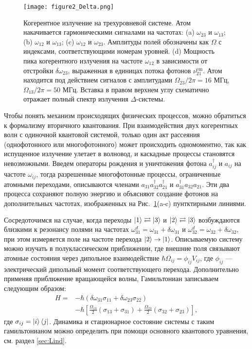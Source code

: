 \begin{figure}[!th]
	\centering
	\texttt{[image: figure2\_Delta.png]}
	\caption[Режимы трехволнового смешения на трехуровневой $\Delta$-системе]{Когерентное излучение на трехуровневой системе. Атом накачивается гармоническими сигналами на частотах: (a) $\omega_{23}$ и $\omega_{13}$; (b) $\omega_{12}$ и $\omega_{13}$; (c) $\omega_{12}$ и $\omega_{23}$. Амплитуды полей обозначены как $\Omega$ с индексами, соответствующими номерам уровней. (d) Мощность пика когерентного излучения на частоте $\omega_{12}$ в зависимости от отстройки $\delta\omega_{23}$, выраженная в единицах потока фотонов $\nu_{21}^{\text{em}}$. Атом находится под действием сигналов с амплитудами $\Omega_{23}/2\pi=16$ МГц, $\Omega_{13}/2\pi=50$ МГц. Вставка в правом верхнем углу схематично отражает полный спектр излучения $\Delta$-системы. }
	\label{fig: 3wm_regimes}
\end{figure}

Чтобы понять механизм происходящих физических процессов, можно обратиться к формализму вторичного квантования. При взаимодействия двух когерентных волн с одиночной квантовой системой, только один акт рассеяния (однофотонного или многофотонного) может происходить одномоментно, так как испущенное излучение улетает в волновод, и каскадные процессы становятся невозможными. Введем операторы рождения и уничтожения фотона  $a^{\dagger}_{ij} \text{ и }a_{ij}$ на частоте $\omega_{ij}$, тогда разрешенные многофотонные процессы, ограниченные атомными переходами, описываются членами $a_{31}a_{32}^{\dagger}a_{21}^{\dagger}$ и $a_{31}^{\dagger}a_{32}a_{21}$. Эти два процесса сохраняют полную энергию и объясняют создание фотонов на дополнительных частотах, изображенных на Рис.~\ref{fig: 3wm_regimes}(a-c) пунтктирными линиями.

Сосредоточимся на случае, когда переходы $\ket{1} \rightleftarrows \ket{3}$ и $\ket{2} \rightleftarrows \ket{3}$ возбуждаются близкими к резонансу полями на частотах $\omega_{31}^{d}=\omega_{31}+\delta\omega_{31}$ и $\omega_{32}^{d}=\omega_{32}+\delta\omega_{32}$, при этом измеряется поле на частоте перехода $\ket{2}\rightarrow\ket{1}$. Описываемую систему можно изучать в полуклассическом приближении, где внешние поля связывают атомные состояния через дипольное взаимодействие $\hbar\Omega_{ij}=\phi_{ij}V_{ij}$, где $\phi_{ij}$ --- электрический дипольный момент соответствующего перехода. Дополнительно применяя приближение вращающейся волны, Гамильтониан записываем следующим образом:
\begin{equation}
	\begin{aligned}
		H={}&-\hbar(\delta\omega_{31}\sigma_{11}+\delta\omega_{23}\sigma_{22})\\
		&-\hbar\left[\frac{\Omega_{13}}{2}(\sigma_{13}+\sigma_{31})+\frac{\Omega_{23}}{2}(\sigma_{32}+\sigma_{23})\right],
	\end{aligned}
	\label{H1}
\end{equation}
где $\sigma_{ij}=\ket{i}\bra{j}$. Динамика и стационарное состояние системы с таким гамильтонианом можно определить при помощи основного квантового уравнения, см. раздел \ref{sec:Lind}.

